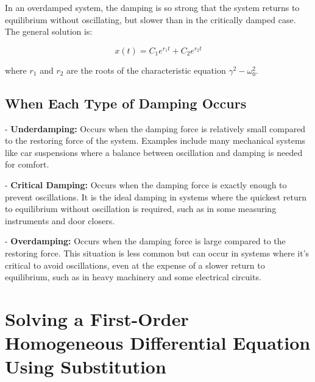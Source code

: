 \documentclass[a4paper,12pt]{article}
\begin{document}
In an overdamped system, the damping is so strong that the system returns to equilibrium without oscillating, but slower than in the critically damped case. The general solution is:

\[ x(t) = C_1 e^{r_1 t} + C_2 e^{r_2 t} \]

where \( r_1 \) and \( r_2 \) are the roots of the characteristic equation \( \gamma^2 - \omega_0^2 \).

\label{fig:overdamped}

\begin{figure}[!ht]
\centering
{}
\end{figure}
\subsection*{When Each Type of Damping Occurs}

- \textbf{Underdamping:} Occurs when the damping force is relatively small compared to the restoring force of the system. Examples include many mechanical systems like car suspensions where a balance between oscillation and damping is needed for comfort.
  
- \textbf{Critical Damping:} Occurs when the damping force is exactly enough to prevent oscillations. It is the ideal damping in systems where the quickest return to equilibrium without oscillation is required, such as in some measuring instruments and door closers.
  
- \textbf{Overdamping:} Occurs when the damping force is large compared to the restoring force. This situation is less common but can occur in systems where it's critical to avoid oscillations, even at the expense of a slower return to equilibrium, such as in heavy machinery and some electrical circuits.


\section*{Solving a First-Order Homogeneous Differential Equation Using Substitution}
\end{document}
